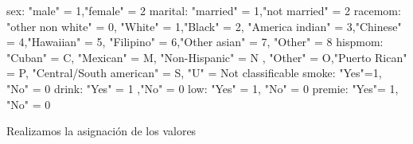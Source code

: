 \documentclass[
]{book}
\newenvironment{Shaded}{\begin{snugshade}}{\end{snugshade}}
\newcommand{\DecValTok}[1]{\textcolor[rgb]{0.00,0.00,0.81}{#1}}
\newcommand{\NormalTok}[1]{#1}
\newcommand{\OtherTok}[1]{\textcolor[rgb]{0.56,0.35,0.01}{#1}}
\newcommand{\SpecialCharTok}[1]{\textcolor[rgb]{0.00,0.00,0.00}{#1}}
\newcommand{\StringTok}[1]{\textcolor[rgb]{0.31,0.60,0.02}{#1}}
\begin{document}
\begin{Shaded}
\begin{Highlighting}[]
\NormalTok{sex}\SpecialCharTok{:} \StringTok{"male"} \OtherTok{=} \DecValTok{1}\NormalTok{,}\StringTok{"female"} \OtherTok{=} \DecValTok{2}
\NormalTok{marital}\SpecialCharTok{:} \StringTok{"married"} \OtherTok{=} \DecValTok{1}\NormalTok{,}\StringTok{"not married"} \OtherTok{=} \DecValTok{2}
\NormalTok{racemom}\SpecialCharTok{:} \StringTok{"other non white"} \OtherTok{=} \DecValTok{0}\NormalTok{, }\StringTok{"White"} \OtherTok{=} \DecValTok{1}\NormalTok{,}\StringTok{"Black"} \OtherTok{=} \DecValTok{2}\NormalTok{,}
         \StringTok{"America indian"} \OtherTok{=} \DecValTok{3}\NormalTok{,}\StringTok{"Chinese"} \OtherTok{=} \DecValTok{4}\NormalTok{,}\StringTok{"Hawaiian"} \OtherTok{=} \DecValTok{5}\NormalTok{,}
         \StringTok{"Filipino"} \OtherTok{=} \DecValTok{6}\NormalTok{,}\StringTok{"Other asian"} \OtherTok{=} \DecValTok{7}\NormalTok{, }\StringTok{"Other"} \OtherTok{=} \DecValTok{8}
\NormalTok{hispmom}\SpecialCharTok{:} \StringTok{"Cuban"} \OtherTok{=}\NormalTok{ C, }\StringTok{"Mexican"} \OtherTok{=}\NormalTok{ M, }\StringTok{"Non{-}Hispanic"} \OtherTok{=}\NormalTok{ N ,}
         \StringTok{"Other"} \OtherTok{=}\NormalTok{ O,}\StringTok{"Puerto Rican"} \OtherTok{=}\NormalTok{ P, }\StringTok{"Central/South american"} \OtherTok{=}\NormalTok{ S,}
         \StringTok{"U"} \OtherTok{=}\NormalTok{ Not classificable}
\NormalTok{smoke}\SpecialCharTok{:} \StringTok{"Yes"}\OtherTok{=}\DecValTok{1}\NormalTok{, }\StringTok{"No"} \OtherTok{=} \DecValTok{0}
\NormalTok{drink}\SpecialCharTok{:} \StringTok{"Yes"} \OtherTok{=} \DecValTok{1}\NormalTok{ ,}\StringTok{"No"} \OtherTok{=} \DecValTok{0}
\NormalTok{low}\SpecialCharTok{:} \StringTok{"Yes"} \OtherTok{=} \DecValTok{1}\NormalTok{, }\StringTok{"No"} \OtherTok{=} \DecValTok{0}
\NormalTok{premie}\SpecialCharTok{:} \StringTok{"Yes"}\OtherTok{=} \DecValTok{1}\NormalTok{, }\StringTok{"No"} \OtherTok{=} \DecValTok{0}
\end{Highlighting}
\end{Shaded}

Realizamos la asignación de los valores
\end{document}
